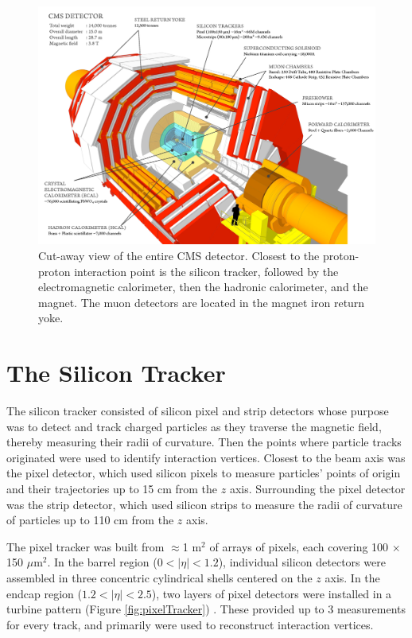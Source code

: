 \begin{figure}[h]
	\centering
	\includegraphics[width=1\textwidth]{figures/cmsDetectorBasic.png}
	\caption{Cut-away view of the entire CMS detector.  Closest to the proton-proton interaction point is the 
		silicon tracker, followed by the electromagnetic calorimeter, then the hadronic calorimeter, and the 
	magnet.  The muon detectors are located in the magnet iron return yoke.}
	\label{fig:layersOfCMS}
\end{figure}

\section{The Silicon Tracker}
\label{sec:siTrackerDescription}
The silicon tracker consisted of silicon pixel and strip detectors whose purpose was to detect and track charged particles 
as they traverse the magnetic field, thereby measuring their radii of curvature.  Then the points where particle tracks 
originated were used to identify interaction vertices.  Closest to the beam axis was the pixel detector, which used 
silicon pixels to measure particles' points of origin and their trajectories up to 15 cm from the $z$ axis.  Surrounding 
the pixel detector was the strip detector, which used silicon strips to measure the radii of curvature of particles up to 
110 cm from the $z$ axis.

The pixel tracker was built from $\approx$1 m$^{2}$ of arrays of pixels, each covering 100 $\times$ 150 $\mu$m$^{2}$.  In 
the barrel region ($0 < |\eta| < 1.2$), individual silicon detectors were assembled in three concentric cylindrical shells 
centered on the $z$ axis.  In the endcap region ($1.2 < |\eta| < 2.5$), two layers of pixel detectors were installed in a 
turbine pattern (Figure \ref{fig:pixelTracker}) \cite{pixelCommissioning}.  These provided up to 3 measurements for every 
track, and primarily were used to reconstruct interaction vertices.

